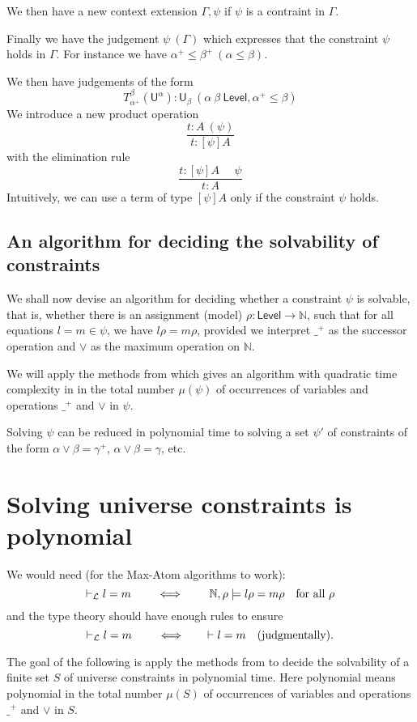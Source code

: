 \documentclass[11pt,a4paper]{article}
\def\UU{\mathsf{U}}
\def\Level{\mathsf{Level}}
\begin{document}
We then have a new context extension $\Gamma,\psi$ if $\psi$ is a contraint in $\Gamma$.

Finally we have the judgement $\psi~(\Gamma)$ which expresses that the constraint $\psi$
holds in $\Gamma$. For instance we have $\alpha^+\leqslant\beta^+~(\alpha\leqslant\beta)$.

We then have judgements of the form
$$
T_{\alpha^+}^{\beta}(\UU^{\alpha}):\UU_{\beta}~(\alpha~\beta~\Level,\alpha^+\leqslant\beta)
$$
We introduce a new product operation
$$
\frac{t:A~(\psi)}{t:[\psi]A}
$$
with the elimination rule
$$
\frac{t:[\psi]A~~~~~~\psi}{t:A}
$$
Intuitively, we can use a term of type $[\psi]A$ only if the constraint $\psi$ holds.

\subsection{An algorithm for deciding the solvability of constraints}

We shall now devise an algorithm for deciding whether a constraint $\psi$ is solvable, that is, whether there is an assignment (model) $\rho : \Level \to \mathbb{N}$, such that for all equations $l = m \in \psi$, we have $l\rho = m\rho$, provided we interpret $\_^+$ as the successor operation and $\vee$ as the maximum operation on $\mathbb{N}$.

We will apply the methods from \cite{BNR08} which gives an algorithm with quadratic time complexity in in the total number $\mu(\psi)$ of occurrences of
variables and operations $\_^+$ and $\vee$ in $\psi$.

Solving $\psi$ can be reduced in polynomial time to solving a set $\psi'$ of
constraints of the form $\alpha\vee\beta = \gamma^+$, $\alpha\vee\beta = \gamma$, etc.

\section{Solving universe constraints is polynomial}\label{sec:P-solvability}

We would need (for the Max-Atom algorithms to work):
\[
\vdash_{\cal L} l=m  \quad \quad \iff \quad \quad \mathbb{N},\rho \models l\rho = m\rho
\text{~~ for all $\rho$}
\]
and the type theory should have enough rules to ensure
\[
\vdash_{\cal L} l=m  \quad \quad \iff \quad \quad \vdash l=m
\text{~~ (judgmentally)}.
\]

The goal of the following is apply the methods from \cite{BNR08} to decide
the solvability of a finite set $S$ of universe constraints in polynomial time.
Here polynomial means polynomial in the total number $\mu(S)$ of occurrences of
variables and operations $\_^+$ and $\vee$ in $S$.
\end{document}
